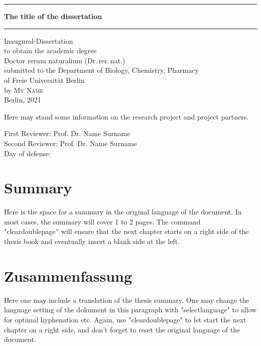 \documentclass[%
a4paper,12pt,ngerman,UKenglish,twoside]{book}
\newcommand{\bigsize}{\fontsize{19.5pt}{25.5pt}\selectfont}
\newcommand{\LMUTitle}{ 
\thispagestyle{empty}
{\parindent0cm
\rule{\linewidth}{.7ex}}
\begin{flushright}
\vspace*{\stretch{1}}
\rmfamily\bfseries\bigsize
The title of the dissertation
\vspace*{\stretch{1}}
\end{flushright}
\rule{\linewidth}{.7ex}

\vspace*{\stretch{3}}
\begin{center}
\begin{large}
Inaugural-Dissertation\\
to obtain the academic degree\\
Doctor rerum naturalium (Dr.\,rer.\,nat.)\\
\vspace*{\stretch{1}}
submitted to the Department of Biology, Chemistry, Pharmacy\\ 
of Freie Universität Berlin\\
\vspace*{\stretch{1}}
by \vspace*{\stretch{1}}
\textsc{My Name}\\
\vspace*{\stretch{2}}
Berlin, 2021
\end{large}
\end{center}
\cleardoublepage
 
\newpage
\thispagestyle{empty}
\begin{flushleft}
Here may stand some information on the research project and project partners.
\end{flushleft}

\vspace*{\stretch{0.1}}
\begin{flushleft}
\begin{large}
First Reviewer: Prof. Dr. Name Surname \\
Second Reviewer: Prof. Dr. Name Surname \\
\vspace*{\stretch{0.1}}
Day of defense: \makebox[5cm][c]{\hfill \makebox[5cm][c] {\hrulefill} \hfill} 
\end{large}
\end{flushleft}
}
\begin{document}
\preto{}
\preto{}
\preto{}
\captionsetup[figure]{list=no}
 \frontmatter %
\LMUTitle
\captionsetup[figure]{list=yes}

\tableofcontents
{}

\chapter*{Summary}

Here is the space for a summary in the original language of the document. In most cases, the summary will cover 1 to 2 pages. The command "cleardoublepage'' will ensure that the next chapter starts on a right side of the thesis book and eventually insert a blank side at the left. 

\cleardoublepage

\chapter*{Zusammenfassung}

Here one may include a translation of the thesis summary. One may change the language setting of the dokument in this paragraph with "selectlanguage" to allow for optimal hyphenation etc. Again, use "cleardoublepage" to let start the next chapter on a right side, and don't forget to reset the original language of the document.
\end{document}
